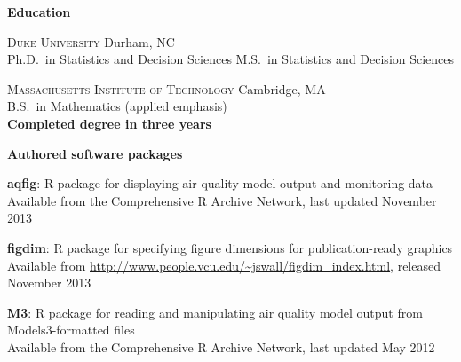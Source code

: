 \documentclass[11pt]{article}
\def\newsectn{\vspace*{0.8cm}}
\def\newitem{\vspace*{0.2cm}}
\begin{document}
\newsectn
\textbf{Education}

\textsc{Duke University} \hfill Durham, NC\\
Ph.D.~in Statistics and Decision Sciences %
M.S.~in Statistics and Decision Sciences %

\newitem
\textsc{Massachusetts Institute of Technology} \hfill Cambridge, MA\\
B.S.~in Mathematics (applied emphasis)\\ %
\textbf{Completed degree in three years}



\newsectn
\noindent \textbf{Authored software packages}

\begin{list}{. }
{
\setlength{\topsep}{0em}
\setlength{\labelsep}{0em}
\setlength{\labelwidth}{0em}
\setlength{\itemindent}{0em}
\setlength{\leftmargin}{0cm}
\setlength{\itemsep}{0cm}
}
\item \textbf{aqfig}: R package for displaying air quality model output and monitoring data\\
Available from the Comprehensive R Archive Network, last updated November 2013  %

\item \textbf{figdim}: R package for specifying figure dimensions for publication-ready graphics\\
Available from \url{http://www.people.vcu.edu/~jswall/figdim_index.html}, released November 2013

\item \textbf{M3}: R package for reading and manipulating air quality model output from Models3-formatted files\\
Available from the Comprehensive R Archive Network, last updated May 2012  %
\end{list}
\end{document}
